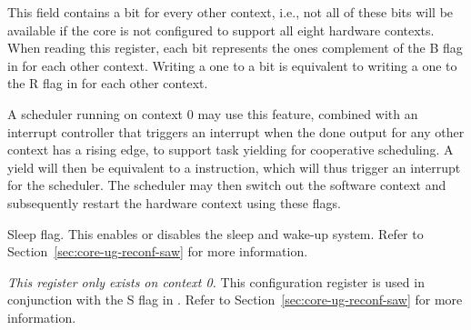 \debugCanWrite{}
\coreCanWrite{}
This field contains a bit for every other context, i.e., not all of these bits
will be available if the core is not configured to support all eight hardware
contexts. When reading this register, each bit represents the ones complement
of the B flag in  for each other context. Writing a one to a bit is
equivalent to writing a one to the R flag in  for each other context.

A scheduler running on context 0 may use this feature, combined with an
interrupt controller that triggers an interrupt when the done output for any
other context has a rising edge, to support task yielding for cooperative
scheduling. A yield will then be equivalent to a  instruction, which
will thus trigger an interrupt for the scheduler. The scheduler may then
switch out the software context and subsequently restart the hardware context
using these flags.

\debugCanWrite{}
\coreCanWrite{}
Sleep flag. This enables or disables the sleep and wake-up system. Refer to
Section~\ref{sec:core-ug-reconf-saw} for more information.


\emph{This register only exists on context 0.} This configuration register is 
used in conjunction with the S flag in . Refer to
Section~\ref{sec:core-ug-reconf-saw} for more information.

\coreCanWrite{}
\debugCanWrite{}


